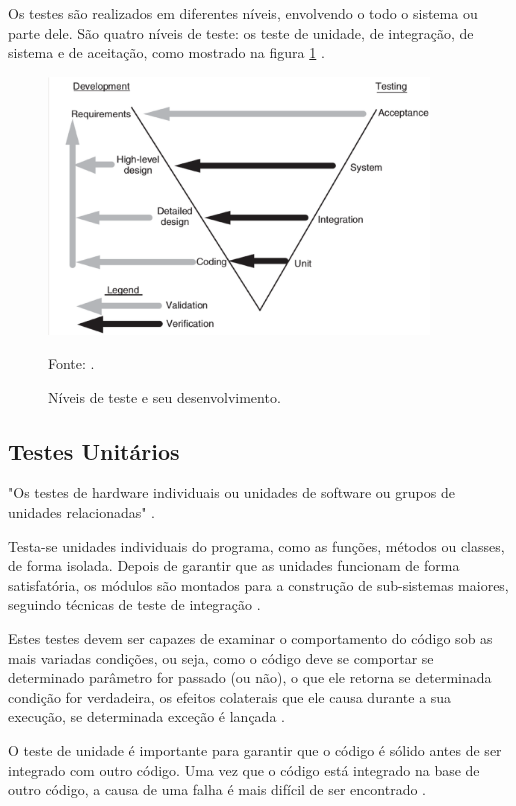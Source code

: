 Os testes são realizados em diferentes níveis, envolvendo o todo o sistema ou parte dele. São quatro níveis de teste: os teste de unidade, de integração, de sistema e de aceitação, como mostrado na figura \ref{nivelTeste} \cite[pág.~18]{naik2008}.

\begin{figure}[htp]
\centering
\includegraphics[width=0.9\textwidth]{figuras/nivelTeste}
\caption{Níveis de teste e seu desenvolvimento.}{Fonte: .} 
\label{nivelTeste}
\end{figure}

\subsection{Testes Unitários}

"Os testes de hardware individuais ou unidades de software ou grupos de unidades relacionadas" \cite{ieee}.

Testa-se unidades individuais do programa, como as funções, métodos ou classes, de forma isolada. Depois de garantir que as unidades funcionam de forma satisfatória, os módulos são montados para a construção de sub-sistemas maiores, seguindo técnicas de teste de integração \cite[pág.~18]{naik2008}.

Estes testes devem ser capazes de examinar o comportamento do código sob as mais variadas condições, ou seja, como o código deve se comportar se determinado parâmetro for passado (ou não), o que ele retorna se determinada condição for verdadeira, os efeitos colaterais que ele causa durante a sua execução, se determinada exceção é lançada \cite{thiago2001}.

O teste de unidade é importante para garantir que o código é sólido antes de ser integrado com outro código. Uma vez que o código está integrado na base de outro código, a causa de uma falha é mais difícil de ser encontrado \cite{williams2006}.

